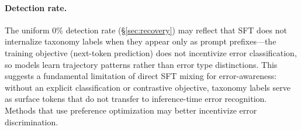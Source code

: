 \paragraph{Detection rate.}
The uniform 0\% detection rate (\S\ref{sec:recovery}) may reflect that SFT does not internalize taxonomy labels when they appear only as prompt prefixes---the training objective (next-token prediction) does not incentivize error classification, so models learn trajectory patterns rather than error type distinctions. This suggests a fundamental limitation of direct SFT mixing for error-awareness: without an explicit classification or contrastive objective, taxonomy labels serve as surface tokens that do not transfer to inference-time error recognition. Methods that use preference optimization \cite{song2024eto} may better incentivize error discrimination.
